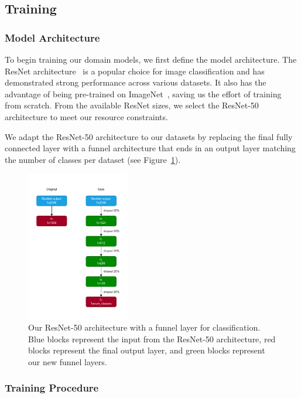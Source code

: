 \subsection{Training}

\subsubsection{Model Architecture}

To begin training our domain models,
we first define the model architecture.
The ResNet architecture~\cite{he_deep_2015,he_identity_2016} is a popular choice for image classification
and has demonstrated strong performance across various datasets.
It also has the advantage of being pre-trained on ImageNet~\cite{deng_imagenet_2009,russakovsky_imagenet_2015},
saving us the effort of training from scratch.
From the available ResNet sizes,
we select the ResNet-50 architecture to meet our resource constraints.

We adapt the ResNet-50 architecture to our datasets by replacing
the final fully connected layer with a funnel architecture that ends
in an output layer matching the number of classes per dataset (see Figure~\ref{fig:resnet_funnel}).

\begin{figure}[H]
      \centering
      \includegraphics[width=0.4\textwidth]{figures/resnet_funnel.pdf}
      \caption{Our ResNet-50 architecture with a funnel layer for classification.
            Blue blocks represent the input from the ResNet-50 architecture,
            red blocks represent the final output layer,
            and green blocks represent our new funnel layers.}
      \label{fig:resnet_funnel}
\end{figure}

\subsubsection{Training Procedure}

